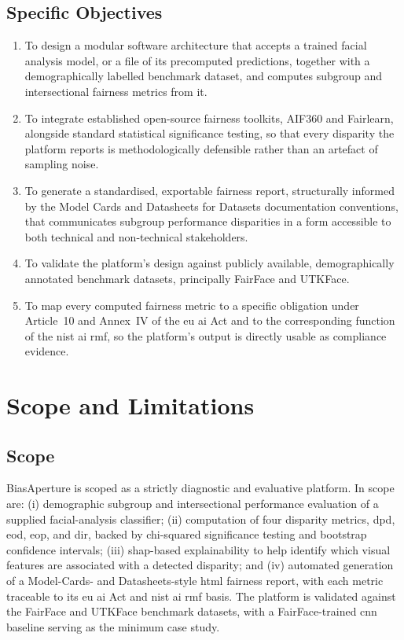 \subsection{Specific Objectives}
\begin{enumerate}
    \item To design a modular software architecture that accepts a trained facial analysis model, or a file of its precomputed predictions, together with a demographically labelled benchmark dataset, and computes subgroup and intersectional fairness metrics from it.
    \item To integrate established open-source fairness toolkits, AIF360 and Fairlearn, alongside standard statistical significance testing, so that every disparity the platform reports is methodologically defensible rather than an artefact of sampling noise.
    \item To generate a standardised, exportable fairness report, structurally informed by the Model Cards \cite{mitchell2019modelcards} and Datasheets for Datasets \cite{gebru2018datasheets} documentation conventions, that communicates subgroup performance disparities in a form accessible to both technical and non-technical stakeholders.
    \item To validate the platform's design against publicly available, demographically annotated benchmark datasets, principally FairFace \cite{karkkainen2021fairface} and UTKFace.
    \item To map every computed fairness metric to a specific obligation under Article~10 and Annex~IV of the \gls{eu} \gls{ai} Act and to the corresponding function of the \gls{nist} \gls{ai} \gls{rmf}, so the platform's output is directly usable as compliance evidence.
\end{enumerate}

\section{Scope and Limitations}

\subsection{Scope}
BiasAperture is scoped as a strictly diagnostic and evaluative platform. In scope are: (i) demographic subgroup and intersectional performance evaluation of a supplied facial-analysis classifier; (ii) computation of four disparity metrics, \gls{dpd}, \gls{eod}, \gls{eop}, and \gls{dir}, backed by chi-squared significance testing and bootstrap confidence intervals; (iii) \gls{shap}-based explainability to help identify which visual features are associated with a detected disparity; and (iv) automated generation of a Model-Cards- and Datasheets-style \gls{html} fairness report, with each metric traceable to its \gls{eu} \gls{ai} Act and \gls{nist} \gls{ai} \gls{rmf} basis. The platform is validated against the FairFace \cite{karkkainen2021fairface} and UTKFace benchmark datasets, with a FairFace-trained \gls{cnn} baseline serving as the minimum case study.

